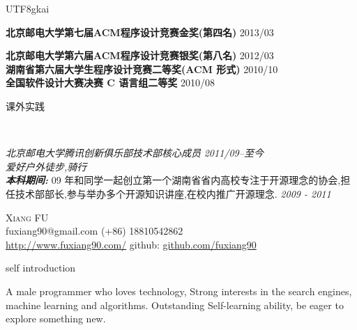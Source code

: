 \documentclass[9pt]{article}
\newenvironment{changemargin}[2]{%
  \begin{list}{}{%
    \setlength{\topsep}{0pt}%
    \setlength{\leftmargin}{#1}%
    \setlength{\rightmargin}{#2}%
    \setlength{\listparindent}{\parindent}%
    \setlength{\itemindent}{\parindent}%
    \setlength{\parsep}{\parskip}%
  }%
  \item[]}{\end{list}
}
\newcommand{\lineover}{
	\begin{changemargin}{-0.05in}{-0.05in}
		\vspace*{-8pt}
		\hrulefill \\
		\vspace*{-2pt}
	\end{changemargin}
}
\newcommand{\header}[1]{
	\begin{changemargin}{-0.5in}{-0.5in}
		\scshape{#1}\\
  	\lineover
	\end{changemargin}
}
\newcommand{\contact}[4]{
	\begin{changemargin}{-0.5in}{-0.5in}
		\begin{center}
			{\Large \scshape {#1}}\\ \smallskip
			{#2}\\ \smallskip 
			{#3}\\ \smallskip
			{#4}\smallskip
		\end{center}
	\end{changemargin}
}
\newenvironment{body} {
	\vspace*{-16pt}
	\begin{changemargin}{-0.25in}{-0.5in}
  }	
	{\end{changemargin}
}
\begin{document}
\begin{CJK}{UTF8}{gkai}
\begin{body}
	\vspace{14pt}
	\textbf {北京邮电大学第七届ACM程序设计竞赛金奖(第四名)}  \hfill  {2013/03} \\
	\smallskip

	\textbf {北京邮电大学第六届ACM程序设计竞赛银奖(第八名)}  \hfill  {2012/03} \\

	\smallskip
	\textbf {湖南省第六届大学生程序设计竞赛二等奖(ACM 形式)}   \hfill  {2010/10}\\
	
	\smallskip
	\textbf{全国软件设计大赛决赛 C 语言组二等奖 } \hfill  {2010/08} \\
\end{body}



\smallskip


\header{课外实践}

\begin{body}
	\vspace{14pt}
	\emph {北京邮电大学腾讯创新俱乐部技术部核心成员} \hfill {} \emph{2011/09--至今}\\
	\emph {爱好户外徒步,骑行} \hfill {} \\

	\smallskip
	\emph {\textbf{本科期间:}}{} {09 年和同学一起创立第一个湖南省省内高校专注于开源理念的协会,担任技术部部长,参与举办多个开源知识讲座,在校内推广开源理念.} \hfill{} \emph{2009 - 2011}\\

\end{body}

\newpage 

\contact{Xiang FU  }{fuxiang90@gmail.com  (+86) 18810542862 } {\url{http://www.fuxiang90.com/} github: \url{github.com/fuxiang90} }  


\header{self introduction}

\begin{body}
	\vspace{14pt}
	A male programmer who loves technology, Strong interests in the search engines, machine learning and algorithms.  Outstanding Self-learning ability, be eager to explore something new.\\


\end{body}
\end{CJK}
\end{document}
